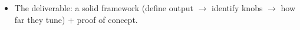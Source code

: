 \begin{itemize}
    \item The deliverable: a solid framework (define output $\to$ identify knobs $\to$ how far they tune) + proof of concept.
\end{itemize}

